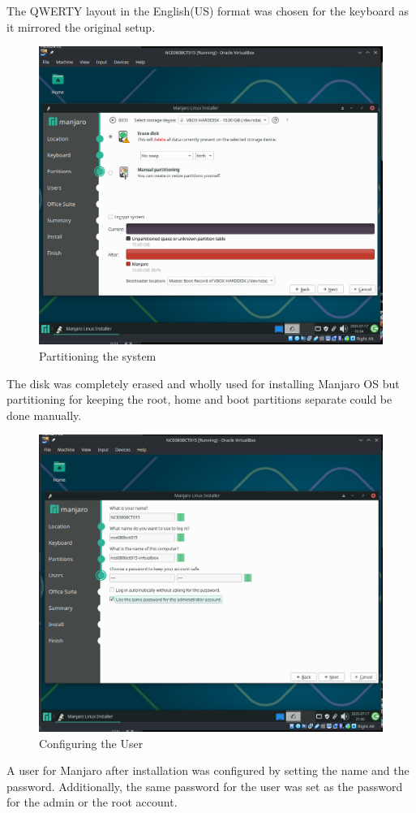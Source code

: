 \documentclass[a4paper,12pt]{report}
\begin{document}
The QWERTY layout in the English(US) format was chosen for the keyboard as it mirrored the original setup.
\newpage
\begin{figure}[h]
    \centering
    \includegraphics[width=1\linewidth]{partition.png}
    \caption{Partitioning the system}
    \label{fig13}
\end{figure}
The disk was completely erased and wholly used for installing Manjaro OS but partitioning for keeping the root, home and boot partitions separate could be done manually.
\newpage
\begin{figure}[h]
    \centering
    \includegraphics[width=1\linewidth]{user_config.png}
    \caption{Configuring the User}
    \label{fig14}
\end{figure}
A user for Manjaro after installation was configured by setting the name and the password. Additionally, the same password for the user was set as the password for the admin or the root account.
\newpage
\end{document}
